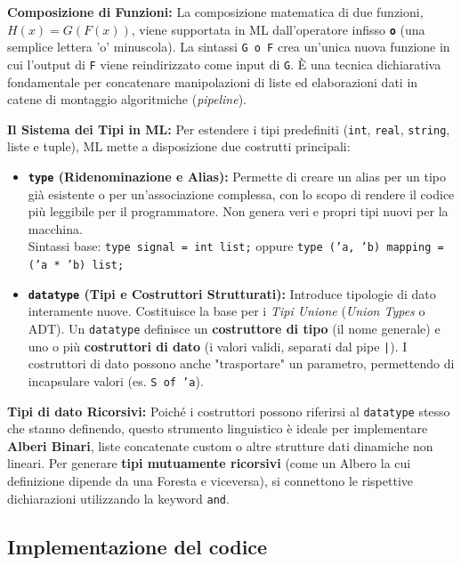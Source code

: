 \documentclass[12pt, a4paper]{article}
\begin{document}
\textbf{Composizione di Funzioni:}
La composizione matematica di due funzioni, $H(x) = G(F(x))$, viene supportata in ML dall'operatore infisso \textbf{\texttt{o}} (una semplice lettera 'o' minuscola). La sintassi \texttt{G o F} crea un'unica nuova funzione in cui l'output di \texttt{F} viene reindirizzato come input di \texttt{G}. È una tecnica dichiarativa fondamentale per concatenare manipolazioni di liste ed elaborazioni dati in catene di montaggio algoritmiche (\textit{pipeline}).

\textbf{Il Sistema dei Tipi in ML:}
Per estendere i tipi predefiniti (\texttt{int}, \texttt{real}, \texttt{string}, liste e tuple), ML mette a disposizione due costrutti principali:
\begin{itemize}
    \item \textbf{\texttt{type} (Ridenominazione e Alias):} Permette di creare un alias per un tipo già esistente o per un'associazione complessa, con lo scopo di rendere il codice più leggibile per il programmatore. Non genera veri e propri tipi nuovi per la macchina. \\
    Sintassi base: \texttt{type signal = int list;} oppure \texttt{type ('a, 'b) mapping = ('a * 'b) list;}
    \item \textbf{\texttt{datatype} (Tipi e Costruttori Strutturati):} Introduce tipologie di dato interamente nuove. Costituisce la base per i \textit{Tipi Unione} (\textit{Union Types} o ADT). 
    Un \texttt{datatype} definisce un \textbf{costruttore di tipo} (il nome generale) e uno o più \textbf{costruttori di dato} (i valori validi, separati dal pipe \texttt{|}). I costruttori di dato possono anche "trasportare" un parametro, permettendo di incapsulare valori (es. \texttt{S of 'a}).
\end{itemize}

\textbf{Tipi di dato Ricorsivi:}
Poiché i costruttori possono riferirsi al \texttt{datatype} stesso che stanno definendo, questo strumento linguistico è ideale per implementare \textbf{Alberi Binari}, liste concatenate custom o altre strutture dati dinamiche non lineari. 
Per generare \textbf{tipi mutuamente ricorsivi} (come un Albero la cui definizione dipende da una Foresta e viceversa), si connettono le rispettive dichiarazioni utilizzando la keyword \texttt{and}.

\subsection{Implementazione del codice}
\end{document}
